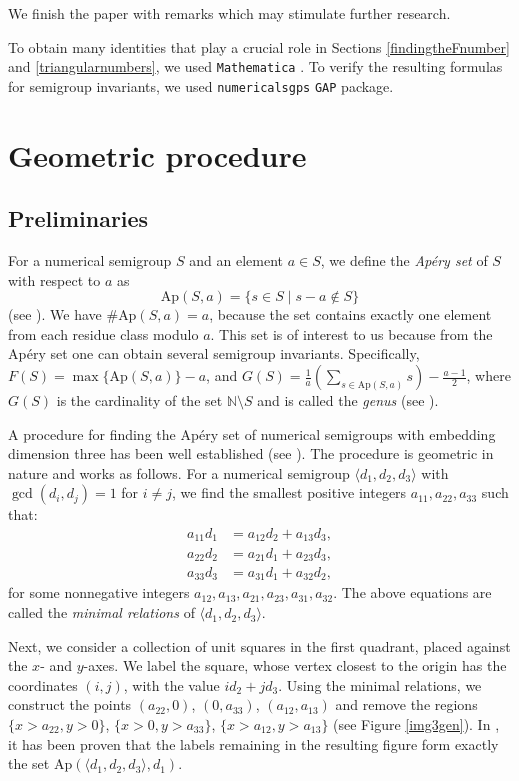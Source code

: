 \documentclass[12pt]{article}
\theoremstyle{remark}
\begin{document}
We finish the paper with remarks which may stimulate further research.

To obtain many identities that play a crucial role in Sections \ref{findingtheFnumber} and \ref{triangularnumbers}, we used \texttt{Mathematica} \cite{Mathematica}. To verify the resulting formulas for semigroup invariants, we used \texttt{numericalsgps} \cite{NumericalSgps} \texttt{GAP} \cite{GAP4} package.






\section{Geometric procedure}\label{geometricprocedure}
\subsection{Preliminaries}
For a numerical semigroup $S$ and an element $a \in S$, we define the \emph{Ap{\'e}ry set} of $S$ with respect to $a$ as
$$ \text{Ap}(S,a) = \{ s \in S \mid s-a \notin S\}$$
(see \cite{Apery1946}). We have $\# \text{Ap}(S,a) = a$, because the set contains exactly one element from each residue class modulo $a$. This set is of interest to us because from the Ap{\'e}ry set one can obtain several semigroup invariants. Specifically, $F(S) = \max \{\text{Ap}(S,a)\} - a$, and $G(S) = \frac{1}{a} \left( \sum_{s \in \text{Ap}(S,a)} s \right) - \frac{a-1}{2}$, where $G(S)$ is the cardinality of the set $\mathbb{N} \setminus S$ and is called the \emph{genus} (see \cite{Selmer1977}).

A procedure for finding the Ap{\'e}ry set of numerical semigroups with embedding dimension three has been well established (see \cite{Brauer1962}). The procedure is geometric in nature and works as follows. For a numerical semigroup $\langle d_1,d_2,d_3 \rangle$ with $\gcd(d_i,d_j) = 1$ for $i \neq j$, we find the smallest positive integers $a_{11},a_{22},a_{33}$ such that: 
\begin{align*}
    a_{11} d_1 &= a_{12} d_2 + a_{13} d_3,  \\
    a_{22} d_2 &= a_{21} d_1 + a_{23} d_3, \\
    a_{33} d_3 &= a_{31} d_1 + a_{32} d_2,
\end{align*}
for some nonnegative integers $a_{12},a_{13},a_{21},a_{23},a_{31},a_{32}$.
The above equations are called the \emph{minimal relations} of $\langle d_1,d_2,d_3 \rangle$.

Next, we consider a collection of unit squares in the first quadrant, placed against the $x$- and $y$-axes. 
We label the square, whose vertex closest to the origin has the coordinates $(i,j)$, with the value $id_2 + jd_3$. Using the minimal relations, we construct the points $(a_{22},0)$, $(0,a_{33})$, $(a_{12},a_{13})$ and remove the regions $\{x > a_{22}, y>0\}$, $\{x > 0, y>a_{33}\}$, $\{x > a_{12}, y>a_{13}\}$ (see Figure \ref{img3gen}). In \cite{Brauer1962}, it has been proven that the labels remaining in the resulting figure form exactly the set $\text{Ap}(\langle d_1,d_2,d_3 \rangle,d_1)$.
\end{document}
